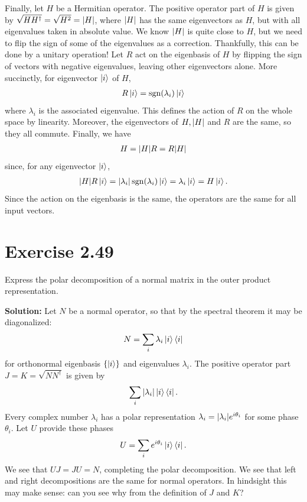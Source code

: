 \documentclass{book}
\begin{document}
    Finally, let $H$ be a Hermitian operator. The positive operator part of $H$ is given by $\sqrt{H H^\dagger} = \sqrt{H^2} = \abs{H}$, where $\abs{H}$ has the same eigenvectors as $H$, but with all eigenvalues taken in absolute value. We know $\abs{H}$ is quite close to $H$, but we need to flip the sign of some of the eigenvalues as a correction. Thankfully, this can be done by a unitary operation! Let $R$ act on the eigenbasis of $H$ by flipping the sign of vectors with negative eigenvalues, leaving other eigenvectors alone. More succinctly, for eigenvector $\ket{i}$ of $H$,
    \begin{align}
        R \ket{i} = \operatorname{sgn}(\lambda_i) \ket{i}
    \end{align}
    where $\lambda_i$ is the associated eigenvalue. This defines the action of $R$ on the whole space by linearity. Moreover, the eigenvectors of $H, \abs{H}$ and $R$ are the same, so they all commute. Finally, we have
    \begin{align}
        H  = \abs{H} R = R \abs{H}
    \end{align}
    since, for any eigenvector $\ket{i}$,
    \begin{align}
        \abs{H} R \ket{i} = \abs{\lambda_i} \operatorname{sgn}(\lambda_i)\ket{i} = \lambda_i \ket{i} = H\ket{i}.
    \end{align}
    Since the action on the eigenbasis is the same, the operators are the same for all input vectors.
    
\section*{Exercise 2.49}
    Express the polar decomposition of a normal matrix in the outer product representation.
    
    \textbf{Solution:} Let $N$ be a normal operator, so that by the spectral theorem it may be diagonalized: 
    \begin{align}
        N = \sum_i \lambda_i \ket{i}\bra{i}
    \end{align}
    for orthonormal eigenbasis $\{\ket{i}\}$ and eigenvalues $\lambda_i$. The positive operator part $J = K = \sqrt{N N^\dagger}$ is given by 
    \begin{align}
        \sum_{i} \abs{\lambda_i} \ket{i}\bra{i}.
    \end{align}
    Every complex number $\lambda_i$ has a polar representation $\lambda_i = \abs{\lambda_i} e^{i\theta_i}$ for some phase $\theta_i$. Let $U$ provide these phases
    \begin{align}
        U = \sum_i e^{i\theta_i} \ket{i}\bra{i}.
    \end{align}
    We see that $UJ = JU = N$, completing the polar decomposition. We see that left and right decompositions are the same for normal operators. In hindsight this may make sense: can you see why from the definition of $J$ and $K$?
    
\end{document}
